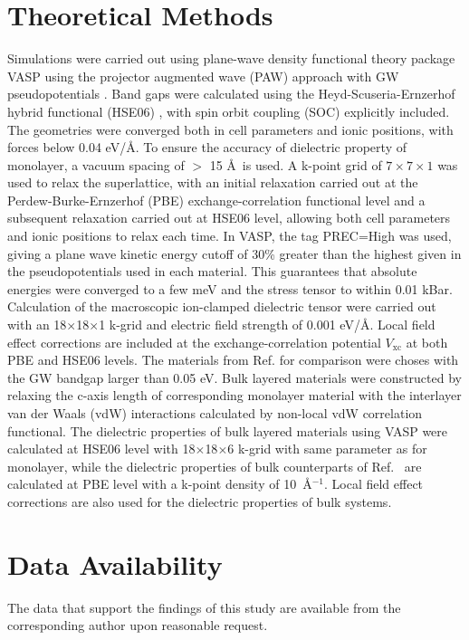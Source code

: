 \documentclass[journal=ancac3,manuscript=article,email=true,hyperref=true,keywords=false]{achemso}
\begin{document}
\section{Theoretical Methods}
\label{sec:org8457dbb}

Simulations were carried out using plane-wave density functional
theory package VASP \cite{Kresse_1993,Kresse_1996_1,Kresse_1996_2}
using the projector augmented wave (PAW) approach with GW
pseudopotentials \cite{Kresse_1999_pseudopotentials}. Band gaps were
calculated using the Heyd-Scuseria-Ernzerhof hybrid functional (HSE06)
\cite{Heyd_2003,HSE_2006}, with spin orbit coupling (SOC) explicitly
included. The geometries were converged both in cell parameters and
ionic positions, with forces below 0.04 eV/\AA. To ensure the accuracy
of dielectric property of monolayer, a vacuum spacing of $>$ 15 \AA~is
used. A k-point grid of \(7\times7\times1\) was used to relax the
superlattice, with an initial relaxation carried out at the
Perdew-Burke-Ernzerhof
(PBE)\cite{Perdew_1996,Ernzerhof_1999,Paier_2005_PBE}
exchange-correlation functional level and a subsequent relaxation
carried out at HSE06 level, allowing both cell parameters and ionic
positions to relax each time. In VASP, the tag PREC=High was used,
giving a plane wave kinetic energy cutoff of 30\% greater than the
highest given in the pseudopotentials used in each material. This
guarantees that absolute energies were converged to a few meV and the
stress tensor to within 0.01 kBar.  Calculation of the macroscopic
ion-clamped dielectric tensor were carried out with an
18$\times$18$\times$1 k-grid and electric field strength of 0.001
eV/\AA.  Local field effect corrections are included at the
exchange-correlation potential $V_{\mathrm{xc}}$ at both PBE and HSE06
levels. The materials from Ref. for comparison
were choses with the GW bandgap larger than 0.05 eV. Bulk layered
materials were constructed by relaxing the c-axis length of
corresponding monolayer material with the interlayer van der Waals
(vdW) interactions calculated by non-local vdW correlation
functional\cite{Lee_2010_vdFD2}.  The dielectric properties of bulk
layered materials using VASP were calculated at HSE06 level with
18$\times$18$\times$6 k-grid with same parameter as for monolayer,
while the dielectric properties of bulk counterparts of
Ref.~ are calculated at PBE level with a
k-point density of 10~\AA$^{-1}$. Local field effect corrections are
also used for the dielectric properties of bulk systems.

\section{Data Availability}
The data that support the findings of this study are available from
the corresponding author upon reasonable request.
\end{document}
